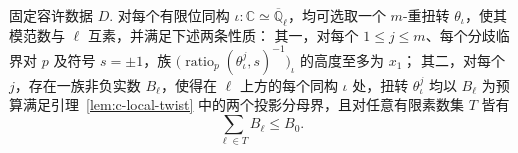 \begin{lemma}[正则扭转族的存在性]
\label{lem:c-regular-family}
\emitthmsource
固定容许数据 $D$. 对每个有限位同构 $\iota:\mathbb C\simeq\overline{\mathbb Q}_\ell$，均可选取一个 $m$-重扭转 $\theta_\iota$，使其模范数与 $\ell$ 互素，并满足下述两条性质：
其一，对每个 $1\le j\le m$、每个分歧临界对 $p$ 及符号 $s=\pm1$，族 $\bigl(\operatorname{ratio}_p(\theta_\iota^j,s)^{-1}\bigr)_\iota$ 的高度至多为 $x_1$；
其二，对每个 $j$，存在一族非负实数 $B_\ell$，使得在 $\ell$ 上方的每个同构 $\iota$ 处，扭转 $\theta_\iota^j$ 均以 $B_\ell$ 为预算满足引理~\ref{lem:c-local-twist} 中的两个投影分母界，且对任意有限素数集 $T$ 皆有
\[
 \sum_{\ell\in T}B_\ell
 \le B_0.
\]
\end{lemma}
